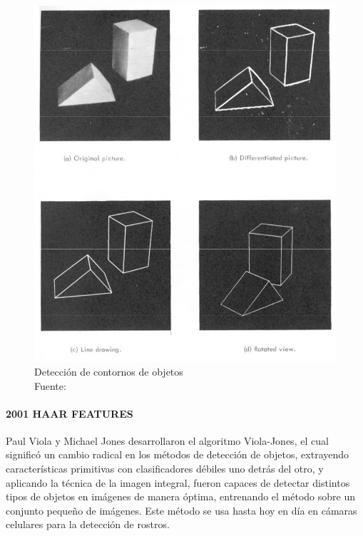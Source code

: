 \begin{figure}[H]
    \centering
    \includegraphics[scale=0.25]{imagenes/machine-perception-of-three-dimensional-solids}
    \caption[Contornos de objetos]{Detección de contornos de objetos\\Fuente: \citep{Roberts_1963}}
\end{figure}
\paragraph{2001 HAAR FEATURES}
Paul Viola y Michael Jones desarrollaron el algoritmo Viola-Jones, el cual significó un cambio radical en los métodos de detección de objetos, extrayendo características primitivas con clasificadores débiles uno detrás del otro, y aplicando la técnica de la imagen integral, fueron capaces de detectar distintos tipos de objetos en imágenes de manera óptima, entrenando el método sobre un conjunto pequeño de imágenes. Este método se usa hasta hoy en día en cámaras celulares para la detección de rostros. \citep{haar-cascade}

